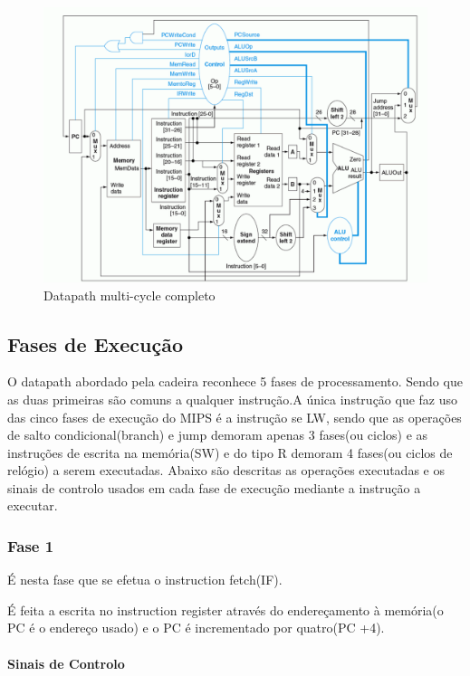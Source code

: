 \documentclass[10pt,a4paper]{book}
\begin{document}
		\begin{figure}[htp]
	    	\centering
	    	\includegraphics[scale=0.3]{mc1.png}
	    	\caption{Datapath multi-cycle completo}
	    	\label{multy-cycle Datapath}
		\end{figure}


		    \subsection{Fases de Execução}

		   O datapath abordado pela cadeira reconhece 5 fases de processamento. Sendo que as duas primeiras são comuns a qualquer instrução.A única instrução que faz uso das cinco fases de execução do MIPS é a instrução se LW, sendo que as operações de salto condicional(branch) e jump demoram apenas 3 fases(ou ciclos) e as instruções de escrita na memória(SW) e do tipo R demoram 4 fases(ou ciclos de relógio) a serem executadas.
		   Abaixo são descritas as operações executadas e os sinais de controlo usados em cada fase de execução mediante a instrução a executar.

			\subsubsection{Fase 1}

			É nesta fase que se efetua o instruction fetch(IF).

			É feita a escrita no instruction register através do endereçamento à memória(o PC é o endereço  usado) e o PC é incrementado por quatro(PC +4).

			\paragraph{Sinais de Controlo}
\end{document}
